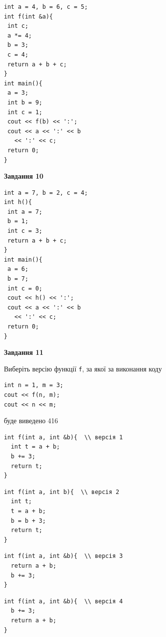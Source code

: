 \documentclass[12pt, ukrainian]{article}
\def\code#1{\Verb!#1!}
\begin{document}
{\begin {large}
\begin{minipage}[t]{7.0cm}
\begin{verbatim}
int a = 4, b = 6, c = 5;
int f(int &a){
 int c;
 a *= 4;
 b = 3;
 c = 4;
 return a + b + c;
}
int main(){
 a = 3;
 int b = 9;
 int c = 1;
 cout << f(b) << ':';
 cout << a << ':' << b 
   << ':' << c;
 return 0;
}
\end{verbatim}



\begin{center}
\textbf{Завдання 10}
\end{center}
\vspace{-8mm}

\begin{verbatim}
int a = 7, b = 2, c = 4;
int h(){
 int a = 7;
 b = 1;
 int c = 3;
 return a + b + c;
}
int main(){
 a = 6;
 b = 7;
 int c = 0;
 cout << h() << ':';
 cout << a << ':' << b 
   << ':' << c;
 return 0;
}
\end{verbatim}

\end{minipage}
\vline \hspace{1mm}
\begin{minipage}[t]{11.0cm}

\begin{center}
\textbf{Завдання 11}
\end{center}
Виберіть версію функції \code{f}, за якої за виконання коду
\begin{verbatim}
int n = 1, m = 3;
cout << f(n, m);
cout << n << m;
\end{verbatim}

буде виведено 416

\begin{verbatim}
int f(int a, int &b){  \\ версія 1
  int t = a + b;
  b += 3;
  return t;
}
\end{verbatim}

\vspace{-8mm}\begin{verbatim}
int f(int a, int b){  \\ версія 2
  int t;
  t = a + b;
  b = b + 3;
  return t;
}
\end{verbatim}

\vspace{-8mm}\begin{verbatim}
int f(int a, int &b){  \\ версія 3
  return a + b;
  b += 3;
}
\end{verbatim}

\vspace{-8mm}\begin{verbatim}
int f(int a, int &b){  \\ версія 4
  b += 3;
  return a + b;
}
\end{verbatim}




\end{minipage}
\end{large}}
\end{document}
